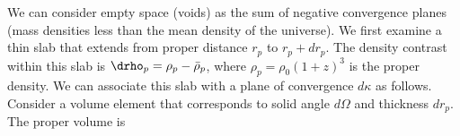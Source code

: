 We can consider empty space (voids) as the sum of negative convergence planes  (mass densities less than the mean density of the universe). We first examine a thin slab that extends from proper distance $r_p$ to $r_p+dr_p$.  The density contrast within this slab is $\drho_p = \rho_p - \bar\rho_p$, where $\rho_p = \rho_0 (1+z)^3$ is the proper density.  We can associate this slab with a plane of convergence $d\kappa$ as follows.  Consider a volume element that corresponds to solid angle $d\Omega$ and thickness $dr_p$. The proper volume is
  
  
  
  